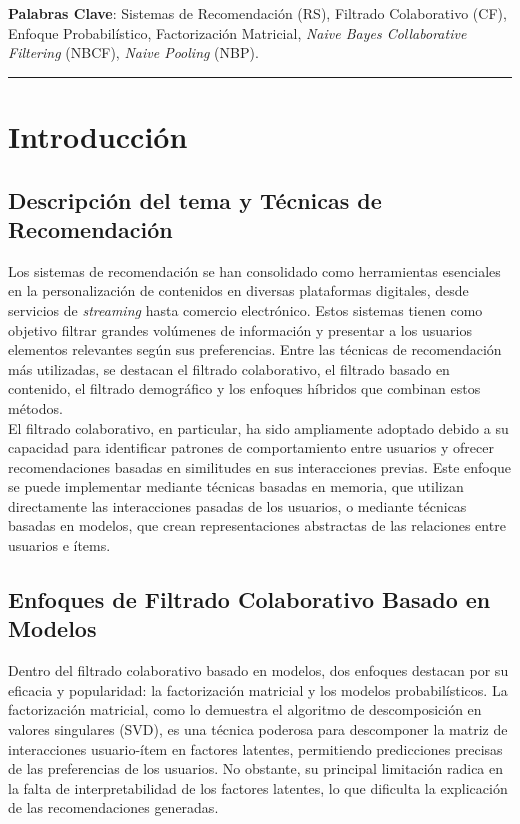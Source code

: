 \documentclass[twocolumn, fontsize=10pt]{article}
\begin{document}
\noindent \textbf{Palabras Clave}: Sistemas de Recomendación (RS), Filtrado Colaborativo (CF), Enfoque Probabilístico, Factorización Matricial, \textit{Naive Bayes Collaborative Filtering} (NBCF), \textit{Naive Pooling} (NBP).

\rule{\linewidth}{0.5pt}


\section{Introducción}

\subsection{Descripción del tema y Técnicas de Recomendación}

Los sistemas de recomendación se han consolidado como 
herramientas esenciales en la personalización de 
contenidos en diversas plataformas digitales, 
desde servicios de \textit{streaming} hasta comercio electrónico. 
Estos sistemas tienen como objetivo filtrar grandes 
volúmenes de información y presentar a los usuarios 
elementos relevantes según sus preferencias. 
Entre las técnicas de recomendación más utilizadas, 
se destacan el filtrado colaborativo, el filtrado 
basado en contenido, el filtrado demográfico y los enfoques híbridos que 
combinan estos métodos.\\

El filtrado colaborativo, en particular, 
ha sido ampliamente adoptado debido a su capacidad 
para identificar patrones de comportamiento entre 
usuarios y ofrecer recomendaciones basadas en 
similitudes en sus interacciones previas. 
Este enfoque se puede implementar mediante técnicas 
basadas en memoria, que utilizan directamente las 
interacciones pasadas de los usuarios, o mediante 
técnicas basadas en modelos, que crean representaciones 
abstractas de las relaciones entre usuarios e ítems.

\subsection{Enfoques de Filtrado Colaborativo Basado en Modelos}

Dentro del filtrado colaborativo basado en modelos, 
dos enfoques destacan por su eficacia y popularidad: 
la factorización matricial y los modelos probabilísticos. 
La factorización matricial, como lo demuestra el 
algoritmo de descomposición en valores singulares (SVD), 
es una técnica poderosa para descomponer la matriz de 
interacciones usuario-ítem en factores latentes, 
permitiendo predicciones precisas de las preferencias 
de los usuarios. No obstante, su principal limitación 
radica en la falta de interpretabilidad de los factores 
latentes, lo que dificulta la explicación de las 
recomendaciones generadas.\\
\end{document}
